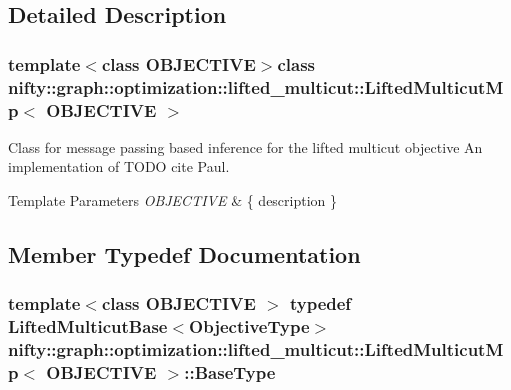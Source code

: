 \subsection{Detailed Description}
\subsubsection*{template$<$class O\+B\+J\+E\+C\+T\+I\+V\+E$>$class nifty\+::graph\+::optimization\+::lifted\+\_\+multicut\+::\+Lifted\+Multicut\+Mp$<$ O\+B\+J\+E\+C\+T\+I\+V\+E $>$}

Class for message passing based inference for the lifted multicut objective An implementation of T\+O\+D\+O cite Paul. 


\begin{DoxyTemplParams}{Template Parameters}
{\em O\+B\+J\+E\+C\+T\+I\+V\+E} & \{ description \} \\
\hline
\end{DoxyTemplParams}


\subsection{Member Typedef Documentation}
\hypertarget{classnifty_1_1graph_1_1optimization_1_1lifted__multicut_1_1LiftedMulticutMp_a2f72b0242500bbb04eb1fc7279ead53a}{}
\subsubsection[{Base\+Type}]{\setlength{\rightskip}{0pt plus 5cm}template$<$class O\+B\+J\+E\+C\+T\+I\+V\+E $>$ typedef {\bf Lifted\+Multicut\+Base}$<${\bf Objective\+Type}$>$ {\bf nifty\+::graph\+::optimization\+::lifted\+\_\+multicut\+::\+Lifted\+Multicut\+Mp}$<$ O\+B\+J\+E\+C\+T\+I\+V\+E $>$\+::{\bf Base\+Type}}\label{classnifty_1_1graph_1_1optimization_1_1lifted__multicut_1_1LiftedMulticutMp_a2f72b0242500bbb04eb1fc7279ead53a}
\hypertarget{classnifty_1_1graph_1_1optimization_1_1lifted__multicut_1_1LiftedMulticutMp_af7d13f50102d758dbbc7aba37dbf3b0b}{}
